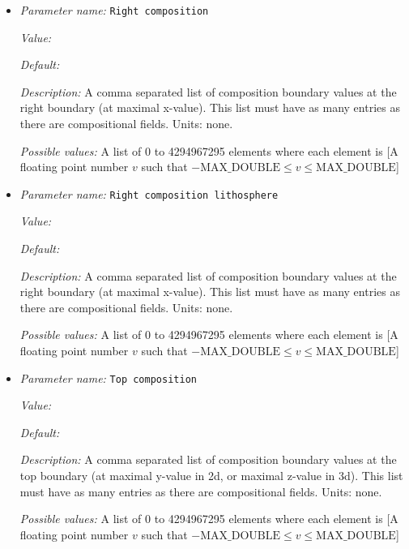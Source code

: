 \begin{itemize}
{\it Possible values:} A list of 0 to 4294967295 elements where each element is [A floating point number $v$ such that $-\text{MAX\_DOUBLE} \leq v \leq \text{MAX\_DOUBLE}$]
\item {\it Parameter name:} {\tt Right composition}
\label{parameters:Boundary composition model/Box with lithosphere boundary indicators/Right composition}


{\it Value:} 


{\it Default:} 


{\it Description:} A comma separated list of composition boundary values at the right boundary (at maximal x-value). This list must have as many entries as there are compositional fields. Units: none.


{\it Possible values:} A list of 0 to 4294967295 elements where each element is [A floating point number $v$ such that $-\text{MAX\_DOUBLE} \leq v \leq \text{MAX\_DOUBLE}$]
\item {\it Parameter name:} {\tt Right composition lithosphere}
\label{parameters:Boundary composition model/Box with lithosphere boundary indicators/Right composition lithosphere}


{\it Value:} 


{\it Default:} 


{\it Description:} A comma separated list of composition boundary values at the right boundary (at maximal x-value). This list must have as many entries as there are compositional fields. Units: none.


{\it Possible values:} A list of 0 to 4294967295 elements where each element is [A floating point number $v$ such that $-\text{MAX\_DOUBLE} \leq v \leq \text{MAX\_DOUBLE}$]
\item {\it Parameter name:} {\tt Top composition}
\label{parameters:Boundary composition model/Box with lithosphere boundary indicators/Top composition}


{\it Value:} 


{\it Default:} 


{\it Description:} A comma separated list of composition boundary values at the top boundary (at maximal y-value in 2d, or maximal z-value in 3d). This list must have as many entries as there are compositional fields. Units: none.


{\it Possible values:} A list of 0 to 4294967295 elements where each element is [A floating point number $v$ such that $-\text{MAX\_DOUBLE} \leq v \leq \text{MAX\_DOUBLE}$]
\end{itemize}

